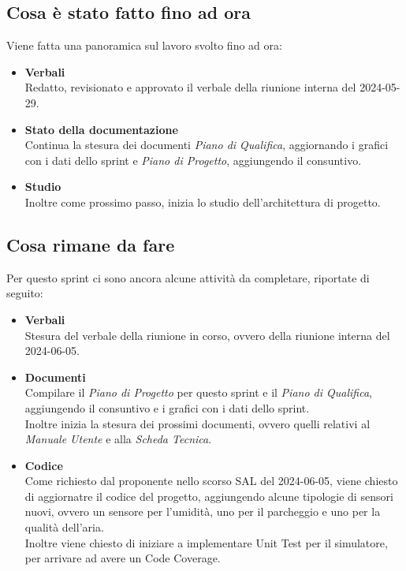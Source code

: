 \documentclass[italian,12pt]{article}
\begin{document}
\subsection{Cosa è stato fatto fino ad ora}
Viene fatta una panoramica sul lavoro svolto fino ad ora:
\begin{itemize}
	\item \textbf{Verbali} \\
		  Redatto, revisionato e approvato il verbale della riunione interna del 2024-05-29.
	\item \textbf{Stato della documentazione} \\
		  Continua la stesura dei documenti \textit{Piano di Qualifica}, aggiornando i grafici con i dati dello sprint e \textit{Piano di Progetto}, aggiungendo il consuntivo.
	\item \textbf{Studio} \\
		  Inoltre come prossimo passo, inizia lo studio dell'architettura di progetto.
\end{itemize}

\subsection{Cosa rimane da fare}
Per questo sprint ci sono ancora alcune attività da completare, riportate di seguito:
\begin{itemize}
	\item \textbf{Verbali} \\
		  Stesura del verbale della riunione in corso, ovvero della riunione interna del 2024-06-05.
	\item \textbf{Documenti} \\
		  Compilare il \textit{Piano di Progetto} per questo sprint e il \textit{Piano di Qualifica}, aggiungendo il consuntivo e i grafici con i dati dello sprint. \\
		  Inoltre inizia la stesura dei prossimi documenti, ovvero quelli relativi al \textit{Manuale Utente} e alla \textit{Scheda Tecnica}.
	\item \textbf{Codice} \\
		  Come richiesto dal proponente nello scorso SAL del 2024-06-05, viene chiesto di aggiornatre il codice del progetto, aggiungendo alcune tipologie di sensori nuovi, ovvero un sensore per l'umidità, uno per il parcheggio e uno per la qualità dell'aria. \\
		  Inoltre viene chiesto di iniziare a implementare Unit Test per il simulatore, per arrivare ad avere un Code Coverage.
\end{itemize}
\end{document}
